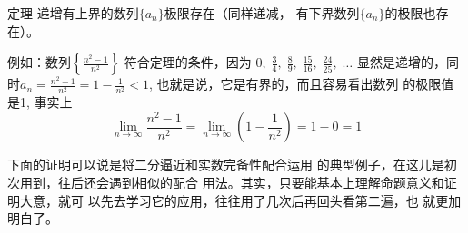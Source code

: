 \begin{blk}{定理}
    递增有上界的数列$\{a_n\}$极限存在（同样递减，
有下界数列$\{a_n\}$的极限也存在）。
\end{blk}
 
例如：数列$\left\{\frac{n^2-1}{n^2}\right\}$
符合定理的条件，因为
$0,\; \frac{3}{4},\; \frac{8}{9},\; \frac{15}{16},\; \frac{24}{25},\; \ldots$
显然是递增的，同时$a_n=\frac{n^2-1}{n^2}=1-\frac{1}{n^2}<1$, 也就是说，它是有界的，而且容易看出数列
的极限值是1, 事实上
\[\lim_{n\to\infty}\frac{n^2-1}{n^2}=\lim_{n\to\infty}\left(1-\frac{1}{n^2}\right)=1-0=1\]

下面的证明可以说是将二分逼近和实数完备性配合运用
的典型例子，在这儿是初次用到，往后还会遇到相似的配合
用法。其实，只要能基本上理解命题意义和证明大意，就可
以先去学习它的应用，往往用了几次后再回头看第二遍，也
就更加明白了。

